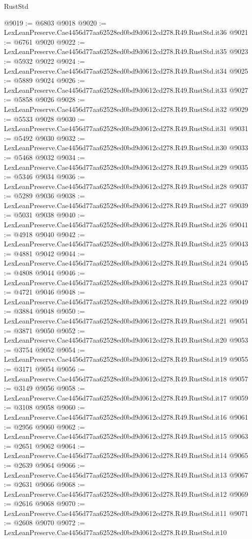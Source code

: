 \begin{lexlean}{RustStd}
\begin{coremodule}
@9019 := @6803 @9018
@9020 := LexLeanPreserve.Cae4456d77aa62528ed0bd9d0612cd278.R49.RustStd.it36
@9021 := @6761 @9020
@9022 := LexLeanPreserve.Cae4456d77aa62528ed0bd9d0612cd278.R49.RustStd.it35
@9023 := @5932 @9022
@9024 := LexLeanPreserve.Cae4456d77aa62528ed0bd9d0612cd278.R49.RustStd.it34
@9025 := @5889 @9024
@9026 := LexLeanPreserve.Cae4456d77aa62528ed0bd9d0612cd278.R49.RustStd.it33
@9027 := @5858 @9026
@9028 := LexLeanPreserve.Cae4456d77aa62528ed0bd9d0612cd278.R49.RustStd.it32
@9029 := @5533 @9028
@9030 := LexLeanPreserve.Cae4456d77aa62528ed0bd9d0612cd278.R49.RustStd.it31
@9031 := @5492 @9030
@9032 := LexLeanPreserve.Cae4456d77aa62528ed0bd9d0612cd278.R49.RustStd.it30
@9033 := @5468 @9032
@9034 := LexLeanPreserve.Cae4456d77aa62528ed0bd9d0612cd278.R49.RustStd.it29
@9035 := @5346 @9034
@9036 := LexLeanPreserve.Cae4456d77aa62528ed0bd9d0612cd278.R49.RustStd.it28
@9037 := @5289 @9036
@9038 := LexLeanPreserve.Cae4456d77aa62528ed0bd9d0612cd278.R49.RustStd.it27
@9039 := @5031 @9038
@9040 := LexLeanPreserve.Cae4456d77aa62528ed0bd9d0612cd278.R49.RustStd.it26
@9041 := @4918 @9040
@9042 := LexLeanPreserve.Cae4456d77aa62528ed0bd9d0612cd278.R49.RustStd.it25
@9043 := @4881 @9042
@9044 := LexLeanPreserve.Cae4456d77aa62528ed0bd9d0612cd278.R49.RustStd.it24
@9045 := @4808 @9044
@9046 := LexLeanPreserve.Cae4456d77aa62528ed0bd9d0612cd278.R49.RustStd.it23
@9047 := @4721 @9046
@9048 := LexLeanPreserve.Cae4456d77aa62528ed0bd9d0612cd278.R49.RustStd.it22
@9049 := @3884 @9048
@9050 := LexLeanPreserve.Cae4456d77aa62528ed0bd9d0612cd278.R49.RustStd.it21
@9051 := @3871 @9050
@9052 := LexLeanPreserve.Cae4456d77aa62528ed0bd9d0612cd278.R49.RustStd.it20
@9053 := @3754 @9052
@9054 := LexLeanPreserve.Cae4456d77aa62528ed0bd9d0612cd278.R49.RustStd.it19
@9055 := @3171 @9054
@9056 := LexLeanPreserve.Cae4456d77aa62528ed0bd9d0612cd278.R49.RustStd.it18
@9057 := @3149 @9056
@9058 := LexLeanPreserve.Cae4456d77aa62528ed0bd9d0612cd278.R49.RustStd.it17
@9059 := @3108 @9058
@9060 := LexLeanPreserve.Cae4456d77aa62528ed0bd9d0612cd278.R49.RustStd.it16
@9061 := @2956 @9060
@9062 := LexLeanPreserve.Cae4456d77aa62528ed0bd9d0612cd278.R49.RustStd.it15
@9063 := @2651 @9062
@9064 := LexLeanPreserve.Cae4456d77aa62528ed0bd9d0612cd278.R49.RustStd.it14
@9065 := @2639 @9064
@9066 := LexLeanPreserve.Cae4456d77aa62528ed0bd9d0612cd278.R49.RustStd.it13
@9067 := @2631 @9066
@9068 := LexLeanPreserve.Cae4456d77aa62528ed0bd9d0612cd278.R49.RustStd.it12
@9069 := @2616 @9068
@9070 := LexLeanPreserve.Cae4456d77aa62528ed0bd9d0612cd278.R49.RustStd.it11
@9071 := @2608 @9070
@9072 := LexLeanPreserve.Cae4456d77aa62528ed0bd9d0612cd278.R49.RustStd.it10

\end{coremodule}
\end{lexlean}
